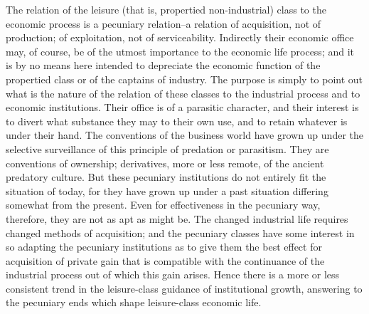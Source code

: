\documentclass[12pt]{report}
\begin{document}
The relation of the leisure (that is, propertied non-industrial)
class to the economic process is a pecuniary relation--a relation of
acquisition, not of production; of exploitation, not of serviceability.
Indirectly their economic office may, of course, be of the utmost
importance to the economic life process; and it is by no means here
intended to depreciate the economic function of the propertied class or
of the captains of industry. The purpose is simply to point out what is
the nature of the relation of these classes to the industrial process
and to economic institutions. Their office is of a parasitic character,
and their interest is to divert what substance they may to their own
use, and to retain whatever is under their hand. The conventions of the
business world have grown up under the selective surveillance of this
principle of predation or parasitism. They are conventions of ownership;
derivatives, more or less remote, of the ancient predatory culture. But
these pecuniary institutions do not entirely fit the situation of today,
for they have grown up under a past situation differing somewhat from
the present. Even for effectiveness in the pecuniary way, therefore,
they are not as apt as might be. The changed industrial life requires
changed methods of acquisition; and the pecuniary classes have some
interest in so adapting the pecuniary institutions as to give them the
best effect for acquisition of private gain that is compatible with the
continuance of the industrial process out of which this gain arises.
Hence there is a more or less consistent trend in the leisure-class
guidance of institutional growth, answering to the pecuniary ends which
shape leisure-class economic life.
\end{document}
